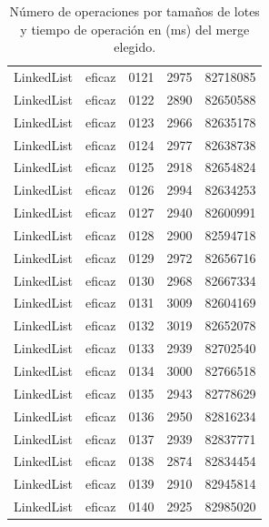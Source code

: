 \documentclass[a4paper,11pt]{report}
\begin{document}
\begin{table}[ht]
\begin{minipage}{0.95\linewidth}
\begin{tabular}{>{\ttfamily}l l l l l}
LinkedList & eficaz & 0121 & 2975 & 82718085\\
LinkedList & eficaz & 0122 & 2890 & 82650588\\
LinkedList & eficaz & 0123 & 2966 & 82635178\\
LinkedList & eficaz & 0124 & 2977 & 82638738\\
LinkedList & eficaz & 0125 & 2918 & 82654824\\
LinkedList & eficaz & 0126 & 2994 & 82634253\\
LinkedList & eficaz & 0127 & 2940 & 82600991\\
LinkedList & eficaz & 0128 & 2900 & 82594718\\
LinkedList & eficaz & 0129 & 2972 & 82656716\\
LinkedList & eficaz & 0130 & 2968 & 82667334\\
LinkedList & eficaz & 0131 & 3009 & 82604169\\
LinkedList & eficaz & 0132 & 3019 & 82652078\\
LinkedList & eficaz & 0133 & 2939 & 82702540\\
LinkedList & eficaz & 0134 & 3000 & 82766518\\
LinkedList & eficaz & 0135 & 2943 & 82778629\\
LinkedList & eficaz & 0136 & 2950 & 82816234\\
LinkedList & eficaz & 0137 & 2939 & 82837771\\
LinkedList & eficaz & 0138 & 2874 & 82834454\\
LinkedList & eficaz & 0139 & 2910 & 82945814\\
LinkedList & eficaz & 0140 & 2925 & 82985020\\

\bottomrule
\end{tabular}
\caption{Número de operaciones por tamaños de lotes y tiempo de operación en (ms) del merge elegido.}
\end{minipage}\smallskip
\end{table}
\end{document}

